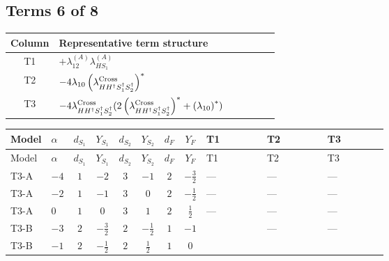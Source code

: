 \documentclass[8pt]{article}
\begin{document}
\begin{landscape}
\subsection*{Terms 6 of 8}
\begin{center}
\begin{tabular}{@{}c >{\raggedright\arraybackslash}p{0.82\linewidth}@{}}
\toprule
Column & Representative term structure \\
\midrule
T1 & \(\displaystyle +{\lambda_{12}^{(A)}} {\lambda_{HS_1}^{(A)}}\) \\
\midrule
T2 & \(\displaystyle -4 {\lambda_{10}} \left({\lambda_{H H^\dagger S_1^\dagger S_2^\dagger}^{\rm Cross}}\right)^{*}\) \\
\midrule
T3 & \(\displaystyle -4 {\lambda_{H H^\dagger S_1^\dagger S_2^\dagger}^{\rm Cross}} (2 \left({\lambda_{H H^\dagger S_1^\dagger S_2^\dagger}^{\rm Cross}}\right)^{*}+\left({\lambda_{10}}\right)^{*})\) \\
\midrule
\bottomrule
\end{tabular}
\end{center}
\smallskip
\tiny
\begin{longtable}{@{}llcccccc >{\raggedright\arraybackslash}p{0.21\linewidth} >{\raggedright\arraybackslash}p{0.21\linewidth} >{\raggedright\arraybackslash}p{0.21\linewidth}@{}}
\toprule
Model & $\alpha$ & $d_{S_1}$ & $Y_{S_1}$ & $d_{S_2}$ & $Y_{S_2}$ & $d_F$ & $Y_F$ & T1 & T2 & T3 \\
\midrule
\endfirsthead
\toprule
Model & $\alpha$ & $d_{S_1}$ & $Y_{S_1}$ & $d_{S_2}$ & $Y_{S_2}$ & $d_F$ & $Y_F$ & T1 & T2 & T3 \\
\midrule
\endhead
T3-A & $-4$ & $1$ & $-2$ & $3$ & $-1$ & $2$ & $-\frac{3}{2}$ & --- & --- & --- \\
\midrule
T3-A & $-2$ & $1$ & $-1$ & $3$ & $0$ & $2$ & $-\frac{1}{2}$ & --- & --- & --- \\
\midrule
T3-A & $0$ & $1$ & $0$ & $3$ & $1$ & $2$ & $\frac{1}{2}$ & --- & --- & --- \\
\midrule
T3-B & $-3$ & $2$ & $-\frac{3}{2}$ & $2$ & $-\frac{1}{2}$ & $1$ & $-1$ & \scriptsize\adjustbox{max width=\linewidth}{$\begin{gathered} +{\lambda_{12}^{(A)}} {\lambda_{HS_1}^{(A)}}\end{gathered}$} & --- & --- \\
\midrule
T3-B & $-1$ & $2$ & $-\frac{1}{2}$ & $2$ & $\frac{1}{2}$ & $1$ & $0$ & \scriptsize\adjustbox{max width=\linewidth}{$\begin{gathered} +{\lambda_{12}^{(A)}} {\lambda_{HS_1}^{(A)}}\end{gathered}$} & \scriptsize\adjustbox{max width=\linewidth}{$\begin{gathered} -4 {\lambda_{10}} \left({\lambda_{H H^\dagger S_1^\dagger S_2^\dagger}^{\rm Cross}}\right)^{*}\end{gathered}$} & \scriptsize\adjustbox{max width=\linewidth}{$\begin{gathered} -4 {\lambda_{H H^\dagger S_1^\dagger S_2^\dagger}^{\rm Cross}} (2 \left({\lambda_{H H^\dagger S_1^\dagger S_2^\dagger}^{\rm Cross}}\right)^{*}+\left({\lambda_{10}}\right)^{*})\end{gathered}$} \\

\end{longtable}
\end{landscape}
\end{document}
